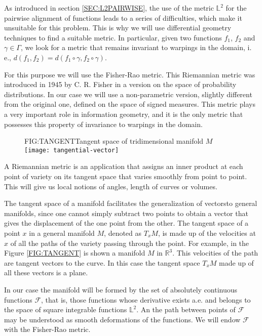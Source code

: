 As introduced in section \ref{SEC:L2PAIRWISE}, the use of the metric $\mathbb{L}^2$
for the pairwise alignment of functions leads to a series of difficulties, which make
it unsuitable for this problem. This is why we will use differential
geometry techniques to find a suitable metric. In particular, given two
functions $f_1$, $f_2$ and $\gamma \in \Gamma$, we look for a metric that
remains invariant to warpings in the domain, i. e.,
$d(f_1, f_2) = d(f_1 \circ \gamma, f_2 \circ \gamma)$.

For this purpose we will use the Fisher-Rao metric. This Riemannian metric was
introduced in 1945 by C. R. Fisher in a version on the
space of probability distributions. In our case we will use a non-parametric
version, slightly different from the original one, defined on the space of
signed measures. This metric plays a very important role in information
geometry, and it is the only metric that possesses this property of
invariance to warpings in the domain\cite{Cencov1982}.

\begin{figure}[Tangent space of tridimensional manifold]{FIG:TANGENT}{Tangent space of tridimensional manifold $M$}
	\texttt{[image: tangential-vector]}
\end{figure}

A Riemannian metric is an application that assigns an inner product at each
point of variety on its tangent space that varies smoothly from point to point.
This will give us local notions of angles, length of curves or volumes.

The tangent space of a manifold facilitates the generalization of
vectorsto general manifolds, since one
cannot simply subtract two points to obtain a vector that gives the displacement
of the one point from the other. The tangent space of a point $x$ in a general
manifold $M$, denoted as $T_xM$, is made up of the velocities at $x$ of all the
paths of the variety passing through the point. For example, in the Figure
\ref{FIG:TANGENT} is shown a manifold $M$ in $\mathbb{R}^3$. This velocities of
the path are tangent vectors to the curve. In this case the tangent space $T_xM$
made up of all these vectors is a plane.



In our case the manifold will be formed by the set of absolutely continuous
functions $\mathcal{F}$, that is, those functions whose derivative exists a.e.
and belongs to the space of square integrable functions $\mathbb{L}^2$. An
the path between points of $\mathcal{F}$ may be understood as smooth
deformations of the functions.
We will endow $\mathcal{F}$ with the Fisher-Rao metric.

